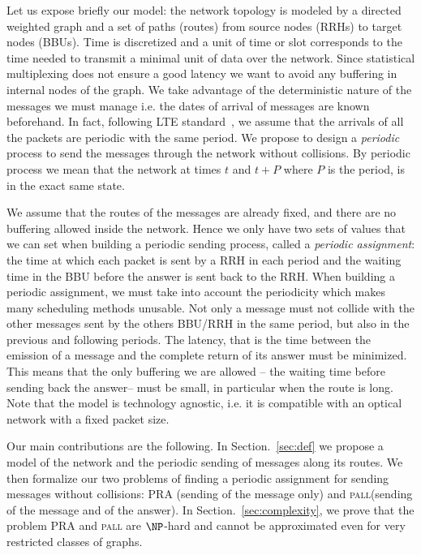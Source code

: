 \documentclass[10pt, conference, letterpaper]{IEEEtran}
\newcommand\pall{\textsc{pall}\xspace}
\begin{document}
Let us expose briefly our model: the network topology is modeled by a directed weighted graph and a set of paths (routes) from source nodes (RRHs) to target nodes (BBUs). Time is discretized and a unit of time or slot corresponds to the time needed to transmit a minimal unit of data over the network. Since statistical multiplexing does not ensure a good latency we want to avoid any  buffering in internal nodes of the graph.  We take advantage of the deterministic nature of the messages we must manage i.e. the dates of arrival of messages are known beforehand. In fact, following LTE standard~\cite{bouguen2012lte}, we assume that the arrivals of all the packets are periodic with the same period. We propose to design a \emph{periodic} process to send the messages through the network without collisions. By periodic process we mean that the network at times $t$ and $t+P$ where $P$ is the period, is in the exact same state. 

We assume that the routes of the messages are already fixed, and there are no buffering allowed inside the network. Hence we only have two sets of values that we can set when building a periodic sending process, called a \emph{periodic assignment}: the time at which each packet is sent by a RRH in each period and the waiting time in the BBU before the answer is sent back to the RRH. When building a periodic assignment, we must take into account the periodicity which makes many scheduling methods unusable. Not only a message must not collide with the other messages sent by the others BBU/RRH in the same period, but also in the previous and following periods. The latency, that is the time between the emission of a message and the complete return of its answer must be minimized. This means that the only buffering we are allowed -- the waiting time before sending back the answer-- must be small, in particular when the route is long. Note that the model is technology agnostic, i.e. it is compatible with an optical network with a fixed packet size.   

Our main contributions are the following.
 In Section.~\ref{sec:def} we propose a model of the network and the periodic sending of messages along its routes.
 We then formalize our two problems of finding a periodic assignment for sending messages without collisions: PRA (sending of the message only) and \pall (sending of the message and of the answer).  
In Section.~\ref{sec:complexity}, we prove that the problem PRA and \pall are $\NP$-hard and cannot be approximated even for very
restricted classes of graphs. 
\end{document}
